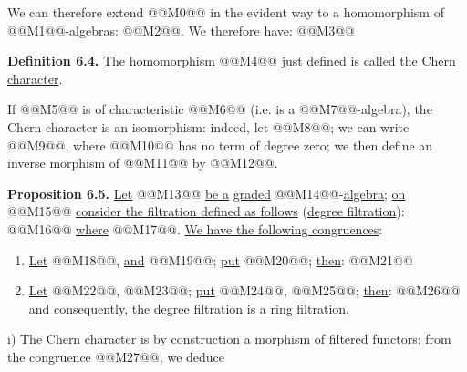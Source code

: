 We can therefore extend @@M0@@ in the evident way to a homomorphism of @@M1@@-algebras: @@M2@@. We therefore have:
@@M3@@

\textbf{Definition 6.4.} \uline{The homomorphism} @@M4@@ \uline{just} \uline{defined is called the Chern character}.

If @@M5@@ is of characteristic @@M6@@ (i.e. is a @@M7@@-algebra), the Chern character is an isomorphism: indeed, let @@M8@@; we can write @@M9@@, where @@M10@@ has no term of degree zero; we then define an inverse morphism of @@M11@@ by @@M12@@.

\textbf{Proposition 6.5.} \uline{Let} @@M13@@ \uline{be a} \uline{graded} @@M14@@-\uline{algebra}; \uline{on} @@M15@@ \uline{consider the filtration defined as follows} (\uline{degree filtration}):
@@M16@@
\uline{where} @@M17@@. \uline{We have the following congruences}:

\begin{enumerate}[label=\roman*)]
\item \uline{Let} @@M18@@, \uline{and} @@M19@@; \uline{put} @@M20@@; \uline{then}:
@@M21@@

\item \uline{Let} @@M22@@, @@M23@@; \uline{put}
@@M24@@, @@M25@@; \uline{then}:
@@M26@@
\uline{and consequently}, \uline{the degree filtration is a ring filtration}.
\end{enumerate}

i) The Chern character is by construction a morphism of filtered functors; from the congruence @@M27@@, we deduce
